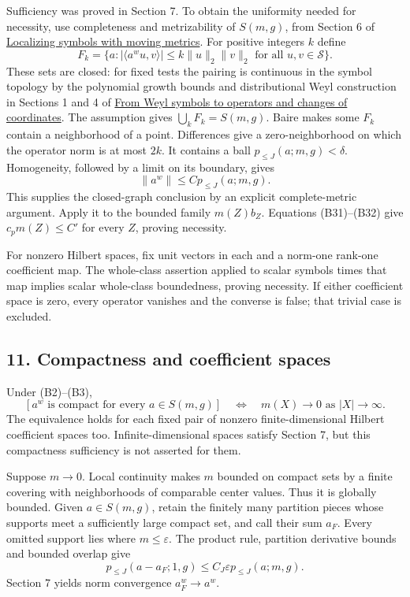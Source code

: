 \documentclass[
  11pt,
]{article}
\begin{document}
Sufficiency was proved in Section 7. To obtain the uniformity needed for
necessity, use completeness and metrizability of \(S(m,g)\), from
Section 6 of \href{metric-localization.pdf}{Localizing symbols with
moving metrics}. For positive integers \(k\) define \[
 F_k=\{a:|\langle a^wu,v\rangle|\le k\|u\|_2\|v\|_2
                  \text{ for all }u,v\in\mathcal S\}.
 \tag{B33}
\] These sets are closed: for fixed tests the pairing is continuous in
the symbol topology by the polynomial growth bounds and distributional
Weyl construction in Sections 1 and 4 of
\href{weyl-covariance-action.pdf}{From Weyl symbols to operators and
changes of coordinates}. The assumption gives \(\bigcup_kF_k=S(m,g)\).
Baire makes some \(F_k\) contain a neighborhood of a point. Differences
give a zero-neighborhood on which the operator norm is at most \(2k\).
It contains a ball \(p_{\le J}(a;m,g)<\delta\). Homogeneity, followed by
a limit on its boundary, gives \[
 \|a^w\|\le Cp_{\le J}(a;m,g).
 \tag{B34}
\] This supplies the closed-graph conclusion by an explicit
complete-metric argument. Apply it to the bounded family \(m(Z)b_Z\).
Equations (B31)--(B32) give \(c_pm(Z)\le C'\) for every \(Z\), proving
necessity.

For nonzero Hilbert spaces, fix unit vectors in each and a norm-one
rank-one coefficient map. The whole-class assertion applied to scalar
symbols times that map implies scalar whole-class boundedness, proving
necessity. If either coefficient space is zero, every operator vanishes
and the converse is false; that trivial case is excluded.

\subsection{11. Compactness and coefficient
spaces}\label{compactness-and-coefficient-spaces}

Under (B2)--(B3), \[
 [a^w\text{ is compact for every }a\in S(m,g)]
 \quad\Longleftrightarrow\quad m(X)\longrightarrow0\text{ as }|X|\to\infty.
 \tag{B35}
\] The equivalence holds for each fixed pair of nonzero
finite-dimensional Hilbert coefficient spaces too. Infinite-dimensional
spaces satisfy Section 7, but this compactness sufficiency is not
asserted for them.

Suppose \(m\to0\). Local continuity makes \(m\) bounded on compact sets
by a finite covering with neighborhoods of comparable center values.
Thus it is globally bounded. Given \(a\in S(m,g)\), retain the finitely
many partition pieces whose supports meet a sufficiently large compact
set, and call their sum \(a_F\). Every omitted support lies where
\(m\le\varepsilon\). The product rule, partition derivative bounds and
bounded overlap give \[
 p_{\le J}(a-a_F;1,g)\le C_J\varepsilon p_{\le J}(a;m,g).
 \tag{B36}
\] Section 7 yields norm convergence \(a_F^w\to a^w\).
\end{document}
